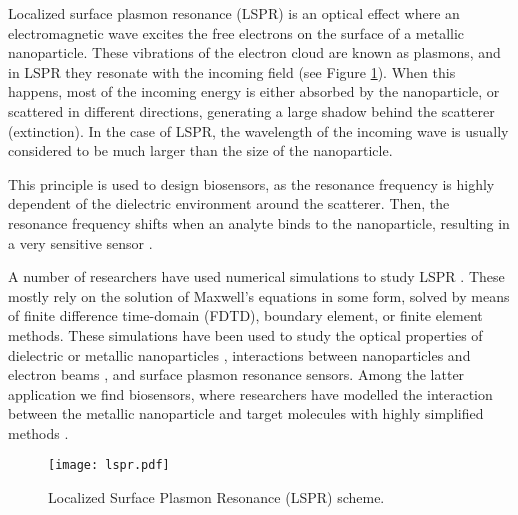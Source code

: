 
Localized surface plasmon resonance (LSPR) is an optical effect where an 
electromagnetic wave excites the free electrons on the surface of a metallic nanoparticle.
These vibrations of the electron cloud are known as plasmons, and in LSPR they resonate with the incoming
field (see Figure \ref{fig:lspr}). When this happens, most of the incoming energy
is either absorbed by the nanoparticle, or scattered in different directions,
generating a large shadow behind the scatterer (extinction). In the case of LSPR,
the wavelength of the incoming wave is usually considered to be much larger than 
the size of the nanoparticle.

This principle is used to design 
biosensors, as the resonance frequency is highly dependent of the dielectric environment 
around the scatterer. 
Then, the resonance frequency shifts when an analyte binds to the nanoparticle, 
resulting in a very sensitive sensor \cite{HaesETal2004, HaesVanduyne2002}.

A number of researchers have used numerical simulations to study LSPR \cite{SolisTaboadaObelleiroLiz-MaarzanGarciadeabajo2014}. These mostly rely on the 
solution of Maxwell's equations in some form, solved by means of finite difference time-domain (FDTD),
boundary element, or finite element methods. 
These simulations have been used to study the 
optical properties of dielectric or metallic nanoparticles \cite{Hohenester2018,HohenesterTrugler2012,
JungPedersenSondergaardPedersenLarsenNielsen2010, VideenSun2003,
MayergoyzFredkinZhang2005, MayergoyzZhang2007}, interactions between nanoparticles
and electron beams \cite{GarciadeabajoAizpurua1997, GarciadeabajoHowie2002},
and surface plasmon resonance sensors.
Among the latter application we find biosensors, where researchers have modelled the 
interaction between the metallic nanoparticle and target molecules with highly 
simplified methods \cite{JungCampbellChinowskyMarYee1998,HaesVanduyne2002,DavisGomezVernon2010,AntosiewiczApellClaudioKall2011}.

\begin{figure}[h] %
   \centering
   \texttt{[image: lspr.pdf]} 
   \caption{Localized Surface Plasmon Resonance (LSPR) scheme. }
   \label{fig:lspr}
\end{figure}


